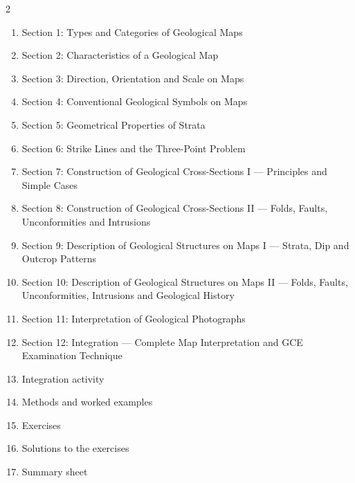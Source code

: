 \documentclass[11pt]{article}
\begin{document}
\begin{sommaire}
\begin{multicols}{2}
\begin{enumerate}
\item Section 1: Types and Categories of Geological Maps
\item Section 2: Characteristics of a Geological Map
\item Section 3: Direction, Orientation and Scale on Maps
\item Section 4: Conventional Geological Symbols on Maps
\item Section 5: Geometrical Properties of Strata
\item Section 6: Strike Lines and the Three-Point Problem
\item Section 7: Construction of Geological Cross-Sections I — Principles and Simple Cases
\item Section 8: Construction of Geological Cross-Sections II — Folds, Faults, Unconformities and Intrusions
\item Section 9: Description of Geological Structures on Maps I — Strata, Dip and Outcrop Patterns
\item Section 10: Description of Geological Structures on Maps II — Folds, Faults, Unconformities, Intrusions and Geological History
\item Section 11: Interpretation of Geological Photographs
\item Section 12: Integration — Complete Map Interpretation and GCE Examination Technique
\item Integration activity
\item Methods and worked examples
\item Exercises
\item Solutions to the exercises
\item Summary sheet
\end{enumerate}
\end{multicols}
\end{sommaire}
\end{document}
